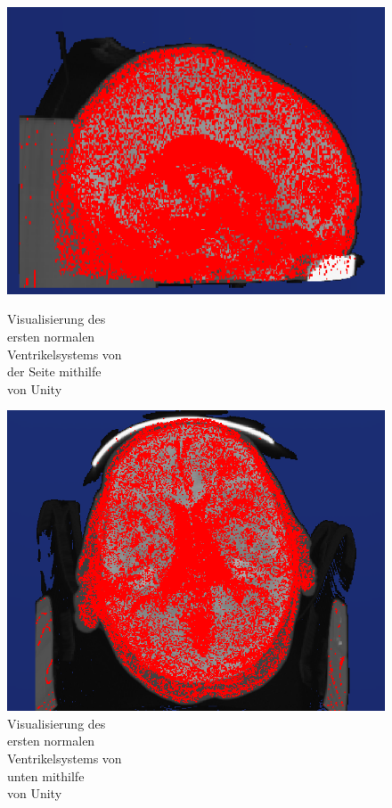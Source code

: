 \begin{figure}[h]
\begin{minipage}[t]{.5\textwidth}
  \centering
  \includegraphics[width=.9\linewidth, height=.9\linewidth]{Logos/Normal1_Unity/Seite.PNG}
  \caption{Visualisierung des \\ ersten normalen \\ Ventrikelsystems von \\ der Seite mithilfe \\ von Unity}
  \label{fig:unity_s}
\end{minipage}%
\begin{minipage}[t]{.5\textwidth}
  \centering
  \includegraphics[width=.9\linewidth, height=.9\linewidth]{Logos/Normal1_Unity/Unten3.PNG}
  \caption{Visualisierung des \\ ersten normalen \\ Ventrikelsystems von \\ unten mithilfe \\ von Unity}
  \label{fig:unity_u}
\end{minipage}
\end{figure}
